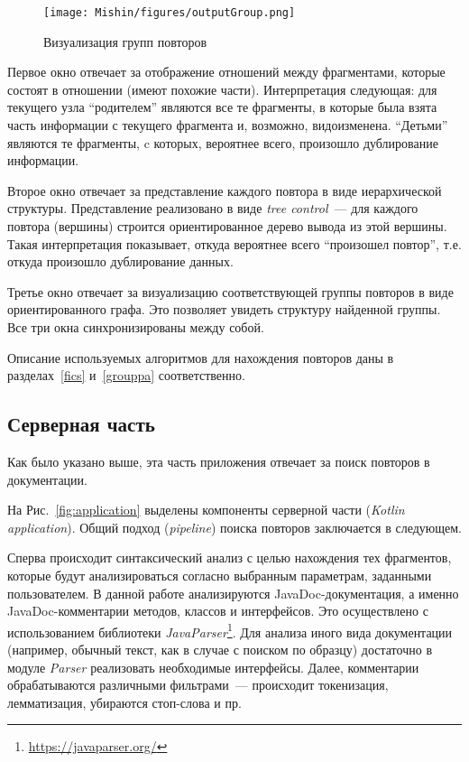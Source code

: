 \begin{figure}[h!]
    \centering
    \texttt{[image: Mishin/figures/outputGroup.png]}
    \caption{Визуализация групп повторов}\label{fig:groupViz}
\end{figure}


Первое окно отвечает за отображение отношений между фрагментами, которые состоят в отношении (имеют похожие части).
Интерпретация следующая: для текущего узла ``родителем'' являются все те фрагменты, в которые была взята часть информации с текущего фрагмента и, возможно, видоизменена.
``Детьми'' являются те фрагменты, c которых, вероятнее всего, произошло дублирование информации.

Второе окно отвечает за представление каждого повтора в виде иерархической структуры.
Представление реализовано в виде \emph{tree control}~--- для каждого повтора (вершины) строится ориентированное дерево вывода из этой вершины.
Такая интерпретация показывает, откуда вероятнее всего ``произошел повтор'', т.е. откуда произошло дублирование данных.

Третье окно отвечает за визуализацию соответствующей группы повторов в  виде ориентированного графа.
Это позволяет увидеть структуру найденной группы. Все три окна синхронизированы между собой.

Описание используемых алгоритмов для нахождения повторов даны в разделах~\ref{fics} и~\ref{grouppa}  соответственно.    



\subsection{Серверная часть}\label{server}
Как было указано выше, эта часть приложения отвечает за поиск повторов в документации.

На Рис.~\ref{fig:application} выделены компоненты серверной части (\emph{Kotlin application}).
Общий подход (\emph{pipeline}) поиска повторов заключается в следующем.

Сперва происходит синтаксический анализ с целью нахождения тех фрагментов, которые будут анализироваться согласно выбранным параметрам, заданными пользователем.
В данной работе анализируются JavaDoc-документация, а именно JavaDoc-комментарии методов, классов и интерфейсов.
Это осуществлено с использованием библиотеки \emph{JavaParser}\footnote{\url{https://javaparser.org/}}.
Для анализа иного вида документации (например, обычный текст, как в случае с поиском по образцу) достаточно в модуле \emph{Parser} реализовать необходимые интерфейсы.
Далее, комментарии обрабатываются различными фильтрами~--- происходит токенизация, лемматизация, убираются стоп-слова и пр.


